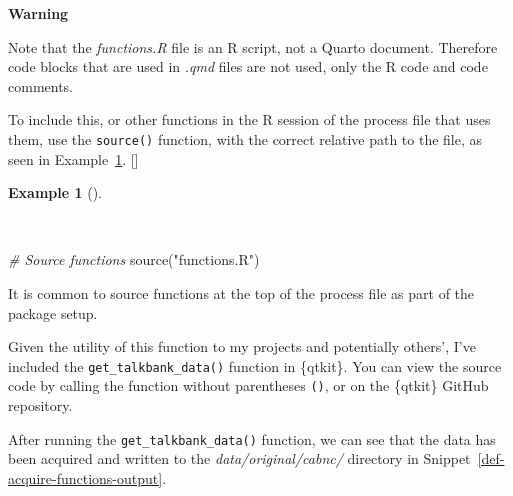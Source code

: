 \documentclass[
  letterpaper,
  krantz1]{latex/krantz-mod}
\newenvironment{Shaded}{\begin{snugshade}}{\end{snugshade}}
\newcommand{\CommentTok}[1]{\textcolor[rgb]{0.00,0.00,0.00}{\textit{#1}}}
\newcommand{\FunctionTok}[1]{\textcolor[rgb]{0.00,0.00,0.00}{#1}}
\newcommand{\NormalTok}[1]{\textcolor[rgb]{0.00,0.00,0.00}{#1}}
\newcommand{\StringTok}[1]{\textcolor[rgb]{0.00,0.00,0.00}{#1}}
\newcommand{\cindex}[1]{%
  \StrSubstitute{#1}{_}{\_}[\temp]%
  \index{\temp}%
}
\theoremstyle{definition}
\theoremstyle{definition}
\newtheorem{example}{Example}[chapter]
\theoremstyle{remark}
\begin{document}
\begin{tcolorbox}[enhanced jigsaw, toprule=.15mm, breakable, colback=white, arc=.35mm, left=2mm, colframe=quarto-callout-color-frame, opacityback=0, bottomrule=.15mm, rightrule=.15mm, leftrule=.75mm]

\textbf{ Warning}

Note that the \emph{functions.R} file is an R script, not a Quarto
document. Therefore code blocks that are used in \emph{.qmd} files are
not used, only the R code and code comments.

\end{tcolorbox}

To include this, or other functions in the R session of the process file
that uses them, use the \texttt{source()} function, with the correct
relative path to the file, as seen in
Example~\ref{exm-acquire-source-functions}. \cindex{source()}

\begin{example}[]\protect\hypertarget{exm-acquire-source-functions}{}\label{exm-acquire-source-functions}

~

\begin{Shaded}
\begin{Highlighting}[numbers=left,,]
\CommentTok{\# Source functions}
\FunctionTok{source}\NormalTok{(}\StringTok{"functions.R"}\NormalTok{)}
\end{Highlighting}
\end{Shaded}

\end{example}

It is common to source functions at the top of the process file as part
of the package setup.

Given the utility of this function to my projects and potentially
others', I've included the \texttt{get\_talkbank\_data()} function in
\{qtkit\}. You can view the source code by calling the function without
parentheses \texttt{()}, or on the \{qtkit\} GitHub
repository.

After running the \texttt{get\_talkbank\_data()} function, we can see
that the data has been acquired and written to the
\emph{data/original/cabnc/} directory in
Snippet~\ref{def-acquire-functions-output}.
\end{document}
